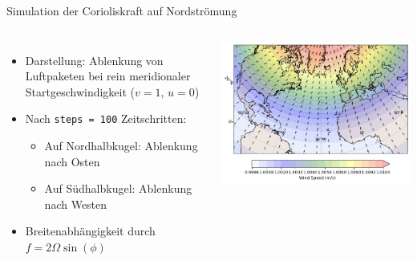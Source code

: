 \begin{frame}{Simulation der Corioliskraft auf Nordströmung}
	\begin{columns}
		\begin{itemize}
			\item Darstellung: Ablenkung von Luftpaketen bei rein meridionaler Startgeschwindigkeit (\(v = 1\), \(u = 0\))
			\item Nach \texttt{steps = 100} Zeitschritten:
			      \begin{itemize}
				      \item Auf Nordhalbkugel: Ablenkung nach Osten
				      \item Auf Südhalbkugel: Ablenkung nach Westen
			      \end{itemize}
			\item Breitenabhängigkeit durch \(f = 2 \Omega \sin(\phi)\)
		\end{itemize}

		\includegraphics[width=\linewidth]{../images/coriolis_effect_plot.png}
	\end{columns}
\end{frame}


